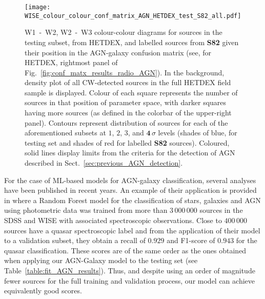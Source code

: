 \documentclass{aa}
\begin{document}
\begin{figure}
   \centering
   \texttt{[image: WISE\_colour\_colour\_conf\_matrix\_AGN\_HETDEX\_test\_S82\_all.pdf]}
   \caption{W1~-~W2, W2~-~W3 colour-colour diagrams for sources in the testing subset, from HETDEX, and labelled sources from \textbf{S82} given their position in the AGN-galaxy confusion matrix (see, for HETDEX, rightmost panel of Fig.~\ref{fig:conf_matx_results_radio_AGN}). In the background, density plot of all CW-detected sources in the full HETDEX field sample is displayed. Colour of each square represents the number of sources in that position of parameter space, with darker squares having more sources (as defined in the colorbar of the upper-right panel). Contours represent distribution of sources for each of the aforementioned subsets at $1$, $2$, $3$, and $\mathbf{4}\,\sigma$ levels (shades of blue, for testing set and shades of red for labelled \textbf{S82} sources). Coloured, solid lines display limits from the criteria for the detection of AGN described in Sect.~\ref{sec:previous_AGN_detection}.}
   \label{fig:W1_W2_W2_W3_AGN_pred_HETDEX_S82}
\end{figure}


For the case of ML-based models for AGN-galaxy classification, several analyses have been published in recent years. An example of their application is provided in \citet{2020A&A...639A..84C} where a Random Forest model for the classification of stars, galaxies and AGN using photometric data was trained from more than $3\,000\,000$ sources in the SDSS \citep[DR15;][]{2019ApJS..240...23A} and WISE with associated spectroscopic observations. Close to $400\,000$ sources have a quasar spectroscopic label and from the application of their model to a validation subset, they obtain a recall of $0.929$ and F1-score of $0.943$ for the quasar classification. These scores are of the same order as the ones obtained when applying our AGN-Galaxy model to the testing set (see Table~\ref{table:fit_AGN_results}). Thus, and despite using an order of magnitude fewer sources for the full training and validation process, our model can achieve equivalently good scores. 
\end{document}
